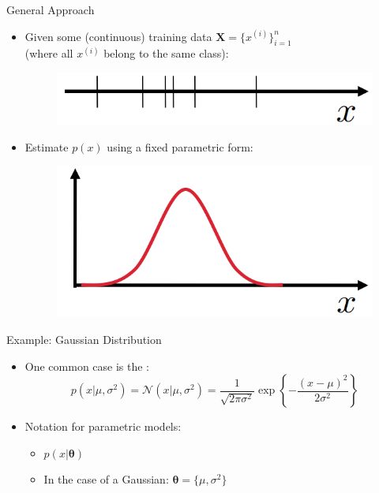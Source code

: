 \begin{frame}{General Approach}{}
	\begin{itemize}
		\item Given some (continuous) training data $\bm{X} = \{ x^{(i)} \}_{i=1}^n$ \\
			(where all $x^{(i)}$ belong to the same class):
		\begin{figure}
			\centering
			\includegraphics[scale=0.3]{04_density_estimation/02_img/pde_data_1d}
		\end{figure}
		\item Estimate $p(x)$ using a fixed parametric form:
		\begin{figure}
			\centering
			\includegraphics[scale=0.3]{04_density_estimation/02_img/pde_result_1d}
		\end{figure}
	\end{itemize}
\end{frame}


\begin{frame}{Example: Gaussian Distribution}{}
	\begin{itemize}
		\item One common case is the :
		\begin{equation}
			p(x \vert \mu, \sigma^2) = \mathcal{N}(x \vert \mu, \sigma^2) = \frac{1}{\sqrt{2 \pi \sigma^2}}
				\exp\left\{ -\frac{(x - \mu)^2}{2 \sigma^2} \right\}
		\end{equation}
		\item Notation for parametric models:
		\begin{itemize}
			\item $p(x \vert \bm{\theta})$
			\item In the case of a Gaussian: $\bm{\theta} = \{ \mu, \sigma^2 \}$
		\end{itemize}
	\end{itemize}
\end{frame}


